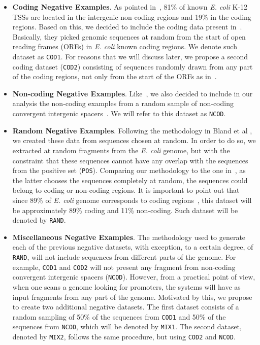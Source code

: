 \documentclass[conference]{IEEEtran}
\begin{document}
\begin{itemize}

\item {\bf Coding Negative Examples}. As pointed in~\cite{gordon2003}, 81\% of known {\it E. coli} K-12 TSSs are located in the intergenic non-coding regions and 19\% in the coding regions. Based on this, we decided to include the coding data present in~\cite{gordon2003,song2011a}. Basically, they picked genomic sequences at random from the start of open reading frames (ORFs) in {\it E. coli} known coding regions. We denote such dataset as {\tt COD1}. For reasons that we will discuss later, we propose a second coding dataset ({\tt COD2}) consisting of sequences randomly drawn from any part of the coding regions, not only from the start of the ORFs as in~\cite{gordon2003,song2011a}. 

\item {\bf Non-coding Negative Examples}. Like~\cite{gordon2003,song2011a}, we also decided to include in our analysis the non-coding examples from a random sample of non-coding convergent intergenic spacers~\cite{palleja2009}. We will refer to this dataset as {\tt NCOD}.

\item {\bf Random Negative Examples}. Following the methodology in Bland et al \cite{bland2010}, we created these data from sequences chosen at random. In order to do so, we extracted at random fragments from the {\it E. coli} genome, but with the constraint that these sequences cannot have any overlap with the sequences from the positive set ({\tt POS}). Comparing our methodology  to the one in~\cite{bland2010}, as the latter chooses the sequences completely at random, the sequences could belong to coding or non-coding regions. It is important to point out that since 89\% of {\it E. coli} genome corresponds to coding regions~\cite{alberts2007}, this dataset will be approximately 89\% coding and 11\% non-coding. Such dataset will be denoted by {\tt RAND}.

\item {\bf Miscellaneous Negative Examples}. The methodology used to generate each of the previous negative datasets, with exception, to a certain degree, of {\tt RAND}, will not include sequences from different parts of the genome. For example, {\tt COD1} and {\tt COD2} will not present any fragment from non-coding convergent intergenic spacers ({\tt NCOD}). However, from a practical point of view, when one scans a genome looking for promoters, the systems will have as input fragments from any part of the genome. Motivated by this, we propose to create two additional negative datasets. The first dataset consists of a random sampling of 50\% of the sequences from {\tt COD1} and  50\% of the sequences from {\tt NCOD}, which will be denoted by {\tt MIX1}. The second dataset, denoted by {\tt MIX2}, follows the same procedure, but using {\tt COD2} and {\tt NCOD}.


\end{itemize}
\end{document}
